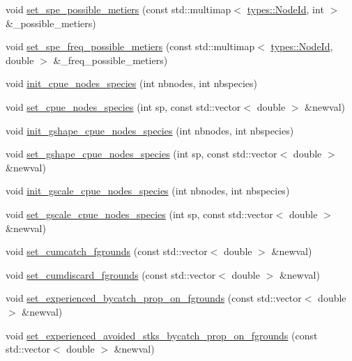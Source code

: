\begin{DoxyCompactItemize}
\item 
void \mbox{\hyperlink{class_vessel_a582e7c58e3f27b4aad1d501e4c2184d5}{set\+\_\+spe\+\_\+possible\+\_\+metiers}} (const std\+::multimap$<$ \mbox{\hyperlink{classtypes_1_1_node_id}{types\+::\+Node\+Id}}, int $>$ \&\+\_\+possible\+\_\+metiers)
\item 
void \mbox{\hyperlink{class_vessel_af78770b11b7fd47a0408e53fb0ea5cb1}{set\+\_\+spe\+\_\+freq\+\_\+possible\+\_\+metiers}} (const std\+::multimap$<$ \mbox{\hyperlink{classtypes_1_1_node_id}{types\+::\+Node\+Id}}, double $>$ \&\+\_\+freq\+\_\+possible\+\_\+metiers)
\item 
void \mbox{\hyperlink{class_vessel_a7d37285d1f6033020f083bd53b8f8dbf}{init\+\_\+cpue\+\_\+nodes\+\_\+species}} (int nbnodes, int nbspecies)
\item 
void \mbox{\hyperlink{class_vessel_a1c1e91081a41889006f16d5e599dc0f1}{set\+\_\+cpue\+\_\+nodes\+\_\+species}} (int sp, const std\+::vector$<$ double $>$ \&newval)
\item 
void \mbox{\hyperlink{class_vessel_a6f0872211776b6ce1868eb1e7a928097}{init\+\_\+gshape\+\_\+cpue\+\_\+nodes\+\_\+species}} (int nbnodes, int nbspecies)
\item 
void \mbox{\hyperlink{class_vessel_a236436d0aa990712dc5d68a28e882a79}{set\+\_\+gshape\+\_\+cpue\+\_\+nodes\+\_\+species}} (int sp, const std\+::vector$<$ double $>$ \&newval)
\item 
void \mbox{\hyperlink{class_vessel_ad0a23d06809ad9e879dfe25077862a98}{init\+\_\+gscale\+\_\+cpue\+\_\+nodes\+\_\+species}} (int nbnodes, int nbspecies)
\item 
void \mbox{\hyperlink{class_vessel_a25258e591be836659df7d1cd05b242c4}{set\+\_\+gscale\+\_\+cpue\+\_\+nodes\+\_\+species}} (int sp, const std\+::vector$<$ double $>$ \&newval)
\item 
void \mbox{\hyperlink{class_vessel_a9ff9bb88a39e33fa0ae699d7119956e9}{set\+\_\+cumcatch\+\_\+fgrounds}} (const std\+::vector$<$ double $>$ \&newval)
\item 
void \mbox{\hyperlink{class_vessel_abfbbb790a0376a77a57d941e032a90ac}{set\+\_\+cumdiscard\+\_\+fgrounds}} (const std\+::vector$<$ double $>$ \&newval)
\item 
void \mbox{\hyperlink{class_vessel_aba80164386a57e07c962cb075a7ee636}{set\+\_\+experienced\+\_\+bycatch\+\_\+prop\+\_\+on\+\_\+fgrounds}} (const std\+::vector$<$ double $>$ \&newval)
\item 
void \mbox{\hyperlink{class_vessel_a2743eb832b551f826823b6fd59b28e69}{set\+\_\+experienced\+\_\+avoided\+\_\+stks\+\_\+bycatch\+\_\+prop\+\_\+on\+\_\+fgrounds}} (const std\+::vector$<$ double $>$ \&newval)

\end{DoxyCompactItemize}
